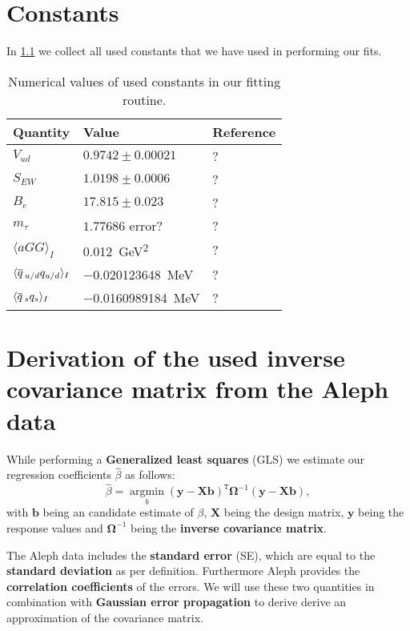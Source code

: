 \documentclass[../../index.tex]{subfiles}
\begin{document}
  \chapter{Constants}
  \label{ch:constants}
  In \cref{table:constants} we collect all used constants that we have used in
  performing our fits.
  \begin{table}[H]
    \centering
    \begin{tabular}{lll}
      \toprule
      Quantity & Value & Reference \\
      \midrule
      \(V_{ud}\) & \(0.9742 \pm 0.00021\) & ? \\
      \(S_{EW}\) & \(1.0198 \pm 0.0006\) & ? \\
      \(B_e\) & \(17.815 \pm 0.023\) & ? \\
      \(m_\tau\) & \(1.77686\) error? & ? \\
      \(\langle  a GG \rangle_I\) & \SI{0.012}{\giga\eV^2} & ? \\
      \(\langle \overline{q}\,_{u/d}q_{u/d} \rangle_I \) & \SI{-0.020123648}{\mega\eV} & ? \\
      \(\langle \overline{q}\,_{s}q_{s} \rangle_I \) & \SI{-0.0160989184}{\mega\eV} & ? \\
      \bottomrule
    \end{tabular}
    \caption{Numerical values of used constants in our fitting routine.}
    \label{table:constants}
  \end{table}


  
  \chapter{Derivation of the used inverse covariance matrix from the Aleph
    data}
  While performing a \textbf{Generalized least squares} (GLS) we estimate our
  regression coefficients $\hat\beta$ as follows:
  \begin{equation}
    \hat\beta = \underset{b}{\operatorname {argmin}}(\mathbf{y} - \mathbf{X} \mathbf{b}
    )^{\mathtt{T}} \mathbf{\Omega}^{-1} (\mathbf{y} - \mathbf{X} \mathbf{b}),
  \end{equation}
  with $\mathbf{b}$ being an candidate estimate of $\beta$, $\mathbf{X}$ being the
  design matrix, $\mathbf{y}$ being the response values and
  $\mathbf{\Omega}^{-1}$ being the \textbf{inverse covariance matrix}.

  The Aleph data includes the \textbf{standard error} (SE), which
  are equal to the \textbf{standard deviation} as per definition. Furthermore
  Aleph provides the \textbf{correlation coefficients} of the errors. We will
  use these two quantities in combination with \textbf{Gaussian error
    propagation} to derive derive an approximation of the covariance matrix.
\end{document}
